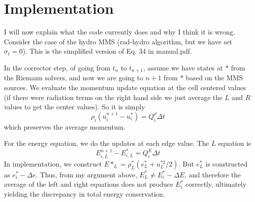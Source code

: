 \documentclass[preprint,12pt]{elsarticle}
\begin{document}
\section{Implementation}

I will now explain what the code currently does and why I think it is wrong.
Consider the case of the hydro MMS (rad-hydro algorithm, but we have set $\sigma_t =
0$).  This is the simplified version of Eq. 34 in manual.pdf.

In the corrector step, of going from $t_n$ to $t_{n+1}$, assume we have states at $*$ from the Riemann solvers,
and now we are going to $n+1$ from
$*$ based on the MMS sources. We evaluate the momentum update equation at the cell
centered values (if there were radiation terms on the right hand side we just average the $L$ and $R$ values
to get the center values). So it is simply
\begin{equation}
    \rho_i(u_i^{n+1} - u_i^{*}) = Q^\rho_i \Delta t 
\end{equation}
which preserves the average momentum.

For the energy equation, we do the updates at each edge value. The $L$ equation is
\begin{equation}
    E_{i,L}^{n+1} - E_{i,L}^* = Q^E_i \Delta t
\end{equation}
In implementation, we construct $E*_L = \rho^*_L(e^*_L + u_L^{*2}/2)$.  But $e^*_L$ is
constructed as $e^*_i - \Delta e$.  Thus, from my argument above, $E_L^*\neq E_i^* - \Delta E$, and
therefore the average of the left and right equations does not produce $E_i^*$
correctly, ultimately yielding the discrepancy in total energy conservation.
\end{document}
